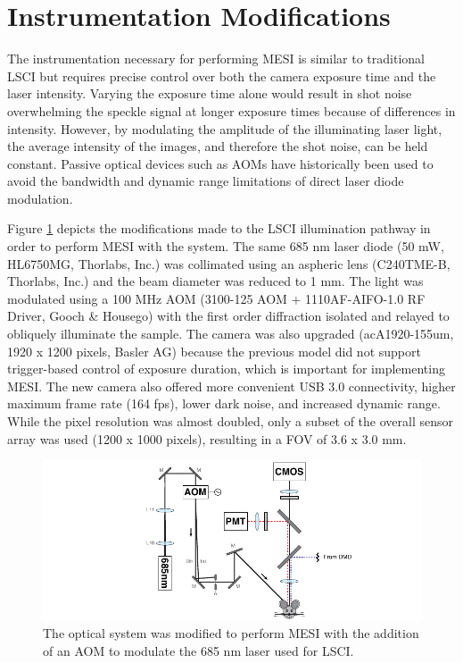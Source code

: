 \section{Instrumentation Modifications}

The instrumentation necessary for performing MESI is similar to traditional LSCI but requires precise control over both the camera exposure time and the laser intensity. Varying the exposure time alone would result in shot noise overwhelming the speckle signal at longer exposure times because of differences in intensity. However, by modulating the amplitude of the illuminating laser light, the average intensity of the images, and therefore the shot noise, can be held constant. Passive optical devices such as AOMs have historically been used to avoid the bandwidth and dynamic range limitations of direct laser diode modulation.

Figure \ref{fig:systemschematic_3} depicts the modifications made to the LSCI illumination pathway in order to perform MESI with the system. The same 685 nm laser diode (50 mW, HL6750MG, Thorlabs, Inc.) was collimated using an aspheric lens (C240TME-B, Thorlabs, Inc.) and the beam diameter was reduced to 1 mm. The light was modulated using a 100 MHz AOM (3100-125 AOM + 1110AF-AIFO-1.0 RF Driver, Gooch \& Housego) with the first order diffraction isolated and relayed to obliquely illuminate the sample. The camera was also upgraded (acA1920-155um, 1920 x 1200 pixels, Basler AG) because the previous model did not support trigger-based control of exposure duration, which is important for implementing MESI. The new camera also offered more convenient USB 3.0 connectivity, higher maximum frame rate (164 fps), lower dark noise, and increased dynamic range. While the pixel resolution was almost doubled, only a subset of the overall sensor array was used (1200 x 1000 pixels), resulting in a FOV of 3.6 x 3.0 mm.

\begin{figure}
    \includegraphics{figures/chapter_4/systemschematic_3.pdf}
    \caption{
        \label{fig:systemschematic_3}
        The optical system was modified to perform MESI with the addition of an AOM to modulate the 685 nm laser used for LSCI.
    }
\end{figure}

